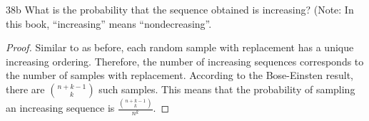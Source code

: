 \begin{exercise}{38b}
What is the probability that the sequence obtained is increasing? (Note: In this
book, “increasing” means “nondecreasing”.
\end{exercise}

\begin{proof}
    Similar to as before, each random sample with replacement has a unique increasing ordering. Therefore, the number of increasing sequences corresponds to the number of samples with replacement. According to the Bose-Einsten result, there are ${ {n+k-1} \choose {k}}$ such samples. This means that the probability of sampling an increasing sequence is $\frac{ { {n+k-1} \choose {k}}}{n^k}$.
\end{proof}

